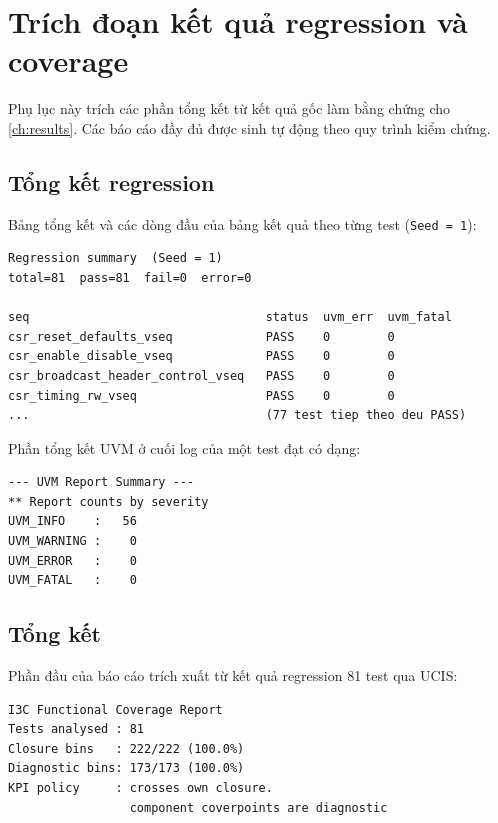\chapter{Trích đoạn kết quả regression và coverage}
\label{app:regression}

Phụ lục này trích các phần tổng kết từ kết quả gốc làm bằng chứng cho
\cref{ch:results}. Các báo cáo đầy đủ được sinh tự động theo quy trình kiểm chứng.

\section*{Tổng kết regression}

Bảng tổng kết và các dòng đầu của bảng kết quả theo từng test (\texttt{Seed = 1}):

\begin{lstlisting}
Regression summary  (Seed = 1)
total=81  pass=81  fail=0  error=0

seq                                 status  uvm_err  uvm_fatal
csr_reset_defaults_vseq             PASS    0        0
csr_enable_disable_vseq             PASS    0        0
csr_broadcast_header_control_vseq   PASS    0        0
csr_timing_rw_vseq                  PASS    0        0
...                                 (77 test tiep theo deu PASS)
\end{lstlisting}

Phần tổng kết UVM ở cuối log của một test đạt có dạng:

\begin{lstlisting}
--- UVM Report Summary ---
** Report counts by severity
UVM_INFO    :   56
UVM_WARNING :    0
UVM_ERROR   :    0
UVM_FATAL   :    0
\end{lstlisting}

\section*{Tổng kết \FunctionalCoverage{}}

Phần đầu của báo cáo \FunctionalCoverage{} trích xuất từ kết quả regression 81 test qua UCIS:

\begin{lstlisting}
I3C Functional Coverage Report
Tests analysed : 81
Closure bins   : 222/222 (100.0%)
Diagnostic bins: 173/173 (100.0%)
KPI policy     : crosses own closure.
                 component coverpoints are diagnostic
\end{lstlisting}

